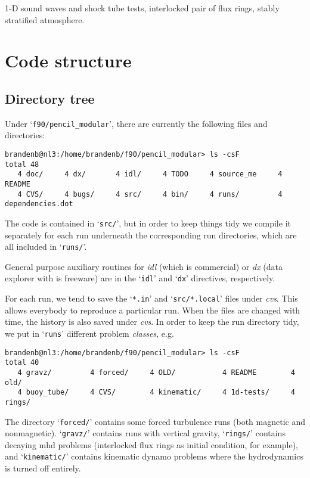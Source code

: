\documentclass[12pt,twoside,notitlepage,a4paper]{article}
\makeatletter
\newcommand{\var}[1]{\textsl{#1}\index{#1@\emph{#1}}\/}
\newcommand{\file}[1]{`\texttt{#1}'}
\makeatother
\begin{document}
1-D sound waves and shock tube tests, interlocked pair of flux rings, stably stratified atmosphere.


\section{Code structure}


\subsection{Directory tree}

Under \file{f90/pencil\_modular}, there are currently the following
files and directories:
\begin{verbatim}
brandenb@nl3:/home/brandenb/f90/pencil_modular> ls -csF
total 48
   4 doc/     4 dx/       4 idl/     4 TODO     4 source_me     4 README
   4 CVS/     4 bugs/     4 src/     4 bin/     4 runs/         4 dependencies.dot
\end{verbatim}

The code is contained in \file{src/}, but in order to keep things tidy we compile
it separately for each run underneath the corresponding run directories, which
are all included in \file{runs/}.

General purpose auxiliary routines for \var{idl} (which is commercial) or
\var{dx} (data explorer with is freeware) are in the \file{idl} and \file{dx}
directives, respectively.

For each run, we tend to save the \file{*.in} and \file{src/*.local}
files under \var{cvs}. This allows everybody to reproduce a particular
run. When the files are changed with time, the history is also saved
under \var{cvs}. In order to keep the run directory tidy, we put
in \file{runs} different problem {\it classes}, e.g.\
\begin{verbatim}
brandenb@nl3:/home/brandenb/f90/pencil_modular> ls -csF
total 40
   4 gravz/         4 forced/     4 OLD/           4 README        4 old/
   4 buoy_tube/     4 CVS/        4 kinematic/     4 1d-tests/     4 rings/
\end{verbatim}

The directory \file{forced/} contains some forced turbulence runs (both magnetic
and nonmagnetic). \file{gravz/} contains runs with vertical gravity, \file{rings/}
contains decaying mhd problems (interlocked flux rings as initial condition, for
example), and \file{kinematic/} contains kinematic dynamo problems where the
hydrodynamics is turned off entirely.
\end{document}
